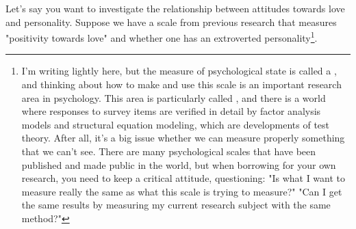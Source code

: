 \documentclass{ltjsbook}
\begin{document}
Let's say you want to investigate the relationship between attitudes towards love and personality. Suppose we have a scale from previous research that measures "positivity towards love" and whether one has an extroverted personality\footnote{I'm writing lightly here, but the measure of psychological state is called a , and thinking about how to make and use this scale is an important research area in psychology. This area is particularly called , and there is a world where responses to survey items are verified in detail by factor analysis models and structural equation modeling, which are developments of test theory. After all, it's a big issue whether we can measure properly something that we can't see. There are many psychological scales that have been published and made public in the world, but when borrowing for your own research, you need to keep a critical attitude, questioning: "Is what I want to measure really the same as what this scale is trying to measure?" "Can I get the same results by measuring my current research subject with the same method?"}.
\end{document}
